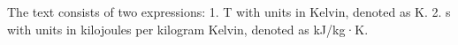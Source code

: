 The text consists of two expressions:
1. T with units in Kelvin, denoted as K.
2. s with units in kilojoules per kilogram Kelvin, denoted as kJ/kg·K.